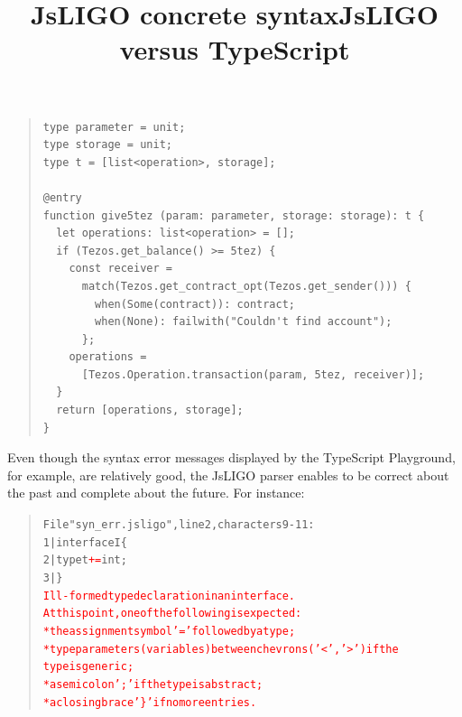 \documentclass[wide]{slides}
\newcommand{\JsLIGO}[0]{\textsf{JsLIGO}}
\begin{document}
\begin{slide}
  \title{JsLIGO concrete syntax}

\begin{quote}
\begin{lstlisting}
type parameter = unit;
type storage = unit;
type t = [list<operation>, storage];

@entry
function give5tez (param: parameter, storage: storage): t {
  let operations: list<operation> = [];
  if (Tezos.get_balance() >= 5tez) {
    const receiver =
      match(Tezos.get_contract_opt(Tezos.get_sender())) {
        when(Some(contract)): contract;
        when(None): failwith("Couldn't find account");
      };
    operations =
      [Tezos.Operation.transaction(param, 5tez, receiver)];
  }
  return [operations, storage];
}
\end{lstlisting}
\end{quote}

\end{slide}

\begin{slide}
  \title{JsLIGO versus TypeScript}

Even though the syntax error messages displayed by the TypeScript
Playground, for example, are relatively good, the \JsLIGO{} parser
enables to be correct about the past and complete about the
future. For instance:
\begin{quote}
\small
\begin{alltt}
File "syn_err.jsligo", line 2, characters 9-11:
  1 | interface I \{
  2 |   type t \textcolor{red}{+=} int;
  3 | \}
\textcolor{red}{Ill-formed type declaration in an interface.
At this point, one of the following is expected:
  * the assignment symbol '=' followed by a type;
  * type parameters (variables) between chevrons ('<', '>') if the
    type is generic;
  * a semicolon ';' if the type is abstract;
  * a closing brace '\}' if no more entries.}
\end{alltt}
\end{quote}

\end{slide}
\end{document}
